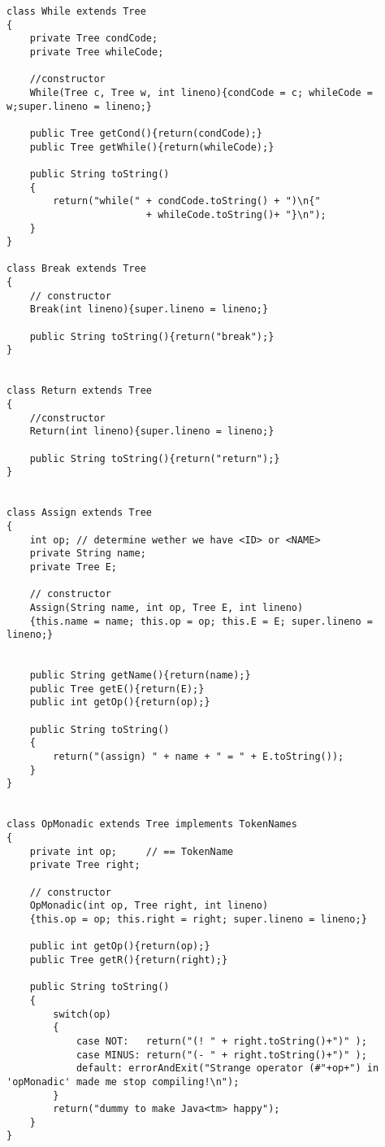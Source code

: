 \begin{footnotesize}
\begin{verbatim}
class While extends Tree
{
    private Tree condCode;
    private Tree whileCode;

    //constructor
    While(Tree c, Tree w, int lineno){condCode = c; whileCode = w;super.lineno = lineno;}

    public Tree getCond(){return(condCode);}
    public Tree getWhile(){return(whileCode);}    
    
    public String toString()
    {
        return("while(" + condCode.toString() + ")\n{" 
                        + whileCode.toString()+ "}\n");
    }
}

class Break extends Tree
{
    // constructor
    Break(int lineno){super.lineno = lineno;}
    
    public String toString(){return("break");}
}


class Return extends Tree 
{
    //constructor
    Return(int lineno){super.lineno = lineno;}
    
    public String toString(){return("return");}
}


class Assign extends Tree
{
    int op; // determine wether we have <ID> or <NAME>
    private String name;
    private Tree E;
     
    // constructor
    Assign(String name, int op, Tree E, int lineno)
    {this.name = name; this.op = op; this.E = E; super.lineno = lineno;}
        
        
    public String getName(){return(name);}
    public Tree getE(){return(E);}
    public int getOp(){return(op);}
    
    public String toString()
    {
        return("(assign) " + name + " = " + E.toString());
    }
}


class OpMonadic extends Tree implements TokenNames
{
    private int op;     // == TokenName
    private Tree right;

    // constructor
    OpMonadic(int op, Tree right, int lineno)
    {this.op = op; this.right = right; super.lineno = lineno;}
    
    public int getOp(){return(op);}
    public Tree getR(){return(right);}
    
    public String toString()
    {
        switch(op)
        {
            case NOT:   return("(! " + right.toString()+")" );
            case MINUS: return("(- " + right.toString()+")" );
            default: errorAndExit("Strange operator (#"+op+") in 'opMonadic' made me stop compiling!\n");
        }    
        return("dummy to make Java<tm> happy");
    }
}



\end{verbatim}
\end{footnotesize}
